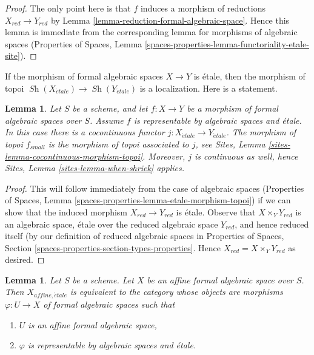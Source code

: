 \documentclass{stacks-project}
\theoremstyle{plain}
\newtheorem{lemma}[subsection]{Lemma}
\theoremstyle{definition}
\theoremstyle{remark}
\numberwithin{equation}{subsection}
\def\Sh{\mathop{\mathit{Sh}}\nolimits}
\def\etale{{\acute{e}tale}}
\begin{document}
\begin{proof}
The only point here is that $f$ induces a morphism of reductions
$X_{red} \to Y_{red}$ by Lemma \ref{lemma-reduction-formal-algebraic-space}.
Hence this lemma is immediate from the corresponding lemma for
morphisms of algebraic spaces (Properties of Spaces,
Lemma \ref{spaces-properties-lemma-functoriality-etale-site}).
\end{proof}

\noindent
If the morphism of formal algebraic spaces $X \to Y$ is \'etale,
then the morphism of topoi $\Sh(X_\etale) \to \Sh(Y_\etale)$
is a localization. Here is a statement.

\begin{lemma}
\label{lemma-etale-morphism-topoi}
Let $S$ be a scheme, and let $f : X \to Y$ be a morphism of
formal algebraic spaces over $S$. Assume $f$ is representable
by algebraic spaces and \'etale. In this case there is a
cocontinuous functor $j : X_\etale \to Y_\etale$.
The morphism of topoi $f_{small}$ is the
morphism of topoi associated to $j$, see
Sites, Lemma \ref{sites-lemma-cocontinuous-morphism-topoi}.
Moreover, $j$ is continuous as well, hence
Sites, Lemma \ref{sites-lemma-when-shriek} applies.
\end{lemma}

\begin{proof}
This will follow immediately from the case of algebraic spaces
(Properties of Spaces, Lemma
\ref{spaces-properties-lemma-etale-morphism-topoi})
if we can show that the induced morphism $X_{red} \to Y_{red}$
is \'etale. Observe that $X \times_Y Y_{red}$ is an
algebraic space, \'etale over the reduced algebraic space $Y_{red}$,
and hence reduced itself (by our definition of reduced algebraic
spaces in Properties of Spaces, Section
\ref{spaces-properties-section-types-properties}.
Hence $X_{red} = X \times_Y Y_{red}$ as desired.
\end{proof}

\begin{lemma}
\label{lemma-affine-identify-affine-etale}
Let $S$ be a scheme. Let $X$ be an affine formal algebraic space over $S$.
Then $X_{affine, \etale}$ is equivalent to the category whose objects
are morphisms $\varphi : U \to X$ of formal algebraic spaces such that
\begin{enumerate}
\item $U$ is an affine formal algebraic space,
\item $\varphi$ is representable by algebraic spaces and \'etale.
\end{enumerate}
\end{lemma}
\end{document}
